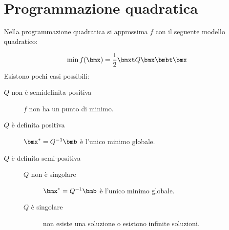 \documentclass[\main/main.tex]{subfiles}
\begin{document}
\chapter{Programmazione quadratica}
Nella programmazione quadratica si approssima \(f\) con il seguente modello quadratico:

\[
	\min f(\bmx) = \frac{1}{2}\bmxt Q\bmx  \bmbt \bmx
\]
Esistono pochi casi possibili:

\begin{description}
	\item[\(Q\) non è semidefinita positiva] \(f\) non ha un punto di minimo.
	\item[\(Q\) è definita positiva] \(\bmx^* = Q^{-1}\bmb \) è l'unico minimo globale.
	\item[\(Q\) è definita semi-positiva]
	      \begin{description}
		      \item[\(Q\) non è singolare]  \(\bmx^* = Q^{-1}\bmb \) è l'unico minimo globale.
		      \item[\(Q\) è singolare] non esiste una soluzione o esistono infinite soluzioni.
	      \end{description}
\end{description}
\end{document}
